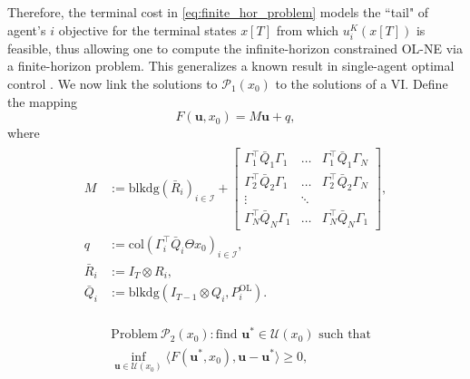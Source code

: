 \documentclass[letterpaper, 10 pt, conference]{ieeeconf}  %
\newcommand{\mc}{\mathcal}
\newcommand{\col}{\mathrm{col}}
\newcommand{\Pol}{P^{\mathrm{OL}}}
\newcommand{\bu}{\boldsymbol{u}}
\newcommand{\blkdiag}{\mathrm{blkdg}}
\begin{document}
Therefore, the terminal cost in \eqref{eq:finite_hor_problem} models the ``tail" of agent's $i$ objective for the terminal states $x[T]$ from which $u_i^K(x[T])$ is feasible, thus allowing one to compute the infinite-horizon constrained OL-NE via a finite-horizon problem. This  generalizes a known result in single-agent optimal control \cite{..}. We now link the solutions to $\mc P_1(x_0)$ to the solutions of a VI. Define the mapping 
\begin{equation} \label{eq:def_F}
        F(\bu, x_0) = M\bu + q,
    \end{equation}
    where
    \begin{align}\label{eq:def_VI_matrices}
    \begin{split}
        M&:= \mathrm{blkdg}(\bar{R}_i)_{i\in\mc I} + \begin{bmatrix}
            \Gamma_1^\top\bar{Q}_1\Gamma_1 & \dots &\Gamma_1^\top\bar{Q}_1\Gamma_N \\
            \Gamma_2^\top\bar{Q}_2\Gamma_1 & \dots & \Gamma_2^\top\bar{Q}_2\Gamma_N \\
            \vdots & \ddots & \\
            \Gamma_N^\top\bar{Q}_N\Gamma_1 & \dots & \Gamma_N^\top\bar{Q}_N\Gamma_1 
        \end{bmatrix}, \\
        q&:= \col(\Gamma_i^{\top}\bar{Q}_i\Theta x_0)_{i\in\mc I},\\
        \bar{R}_i&:= I_T\otimes R_i, \\
        \bar{Q}_i&:= \blkdiag(I_{T-1}\otimes Q_i, \Pol_i).
    \end{split}
    \end{align}

\begin{align}
\begin{split}
    &\text{Problem}~ \mc P_2(x_0): \text{find $\bu^*\in \mc U(x_0) $ such that} \\
    &\inf\limits_{\bu\in \mc U(x_0)}\langle F(\bu^*, x_0), \bu - \bu^* \rangle \geq 0,
\end{split}
\end{align}
\end{document}
